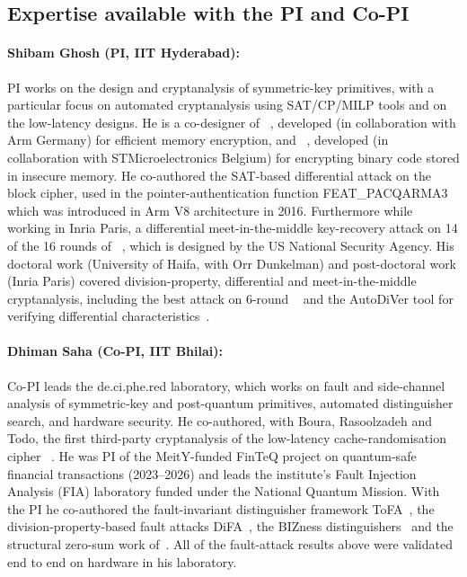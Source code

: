 \subsection{Expertise available with the PI and Co-PI}

\paragraph{Shibam Ghosh (PI, IIT Hyderabad):} PI works on the design and cryptanalysis of symmetric-key primitives, with a particular focus on automated cryptanalysis using SAT/CP/MILP tools and on the low-latency designs.
He is a co-designer of ~, developed (in collaboration with Arm Germany) for efficient memory encryption, and ~, developed (in collaboration with STMicroelectronics Belgium) for encrypting binary code stored in insecure memory. 
He co-authored the SAT-based differential attack on the  block cipher, used in the pointer-authentication function \textsf{FEAT\_PACQARMA3}~ which was introduced in Arm V8 architecture in 2016.
Furthermore while working in Inria Paris, a differential meet-in-the-middle key-recovery attack on 14 of the 16 rounds of ~, which is designed by the US National Security Agency.
His doctoral work (University of Haifa, with Orr Dunkelman) and post-doctoral work (Inria Paris) covered division-property, differential and meet-in-the-middle cryptanalysis, including the best attack on 6-round \AES~ and the \textsf{AutoDiVer} tool for verifying differential characteristics~.

\paragraph{Dhiman Saha (Co-PI, IIT Bhilai):} Co-PI leads the de.ci.phe.red laboratory, which works on fault and side-channel analysis of symmetric-key and post-quantum primitives, automated distinguisher search, and hardware security.
He co-authored, with Boura, Rasoolzadeh and Todo, the first third-party cryptanalysis of the low-latency cache-randomisation cipher ~.
He was PI of the MeitY-funded FinTeQ project on quantum-safe financial transactions (2023--2026) and leads the institute's Fault Injection Analysis (FIA) laboratory funded under the National Quantum Mission.
With the PI he co-authored the fault-invariant distinguisher framework \textsf{ToFA}~, the division-property-based fault attacks \textsf{DiFA}~, the \textsf{BIZness} distinguishers~ and the structural zero-sum work of~.
All of the fault-attack results above were validated end to end on hardware in his laboratory.

